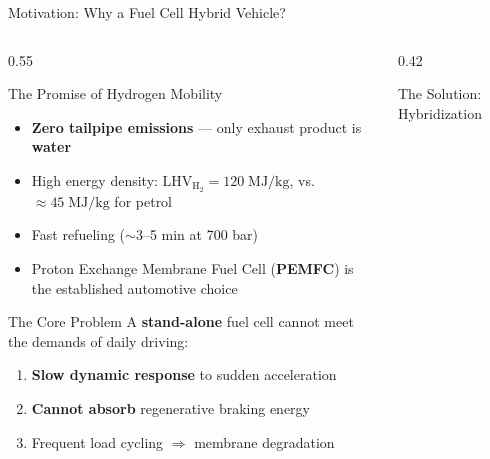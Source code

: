 \documentclass[aspectratio=169, 10pt]{beamer}
\newcommand{\LHV}{\mathrm{LHV}_{\mathrm{H_2}}}
\newcommand{\highlight}[1]{\textcolor{fcgold!80!black}{\textbf{#1}}}
\begin{document}
\begin{frame}{Motivation: Why a Fuel Cell Hybrid Vehicle?}
  \begin{columns}[T]
    \begin{column}{0.55\textwidth}
      \begin{block}{The Promise of Hydrogen Mobility}
        \begin{itemize}
          \item \textbf{Zero tailpipe emissions} — only exhaust product is \highlight{water}
          \item High energy density: $\LHV = 120\;\text{MJ/kg}$, vs.\ $\approx 45\;\text{MJ/kg}$ for petrol
          \item Fast refueling ($\sim$3–5 min at 700 bar)
          \item Proton Exchange Membrane Fuel Cell (\textbf{PEMFC}) is the established automotive choice
        \end{itemize}
      \end{block}
      \vspace{4pt}
      \begin{alertblock}{The Core Problem}
        A \textbf{stand-alone} fuel cell cannot meet the demands of daily driving:
        \begin{enumerate}
          \item \highlight{Slow dynamic response} to sudden acceleration
          \item \highlight{Cannot absorb} regenerative braking energy
          \item Frequent load cycling $\Rightarrow$ membrane degradation
        \end{enumerate}
      \end{alertblock}
    \end{column}
    \begin{column}{0.42\textwidth}
      \begin{block}{The Solution: Hybridization}
        \centering
\end{block}
\end{column}
\end{columns}
\end{frame}
\end{document}
